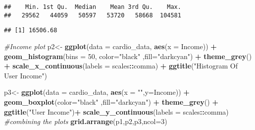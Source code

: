 \documentclass[
]{article}
\newenvironment{Shaded}{\begin{snugshade}}{\end{snugshade}}
\newcommand{\CommentTok}[1]{\textcolor[rgb]{0.56,0.35,0.01}{\textit{#1}}}
\newcommand{\DataTypeTok}[1]{\textcolor[rgb]{0.13,0.29,0.53}{#1}}
\newcommand{\DecValTok}[1]{\textcolor[rgb]{0.00,0.00,0.81}{#1}}
\newcommand{\KeywordTok}[1]{\textcolor[rgb]{0.13,0.29,0.53}{\textbf{#1}}}
\newcommand{\NormalTok}[1]{#1}
\newcommand{\OperatorTok}[1]{\textcolor[rgb]{0.81,0.36,0.00}{\textbf{#1}}}
\newcommand{\StringTok}[1]{\textcolor[rgb]{0.31,0.60,0.02}{#1}}
\begin{document}
\begin{verbatim}
##    Min. 1st Qu.  Median    Mean 3rd Qu.    Max. 
##   29562   44059   50597   53720   58668  104581
\end{verbatim}

\begin{Shaded}
\end{Shaded}

\begin{verbatim}
## [1] 16506.68
\end{verbatim}

\begin{Shaded}
\begin{Highlighting}[]
\CommentTok{#Income plot}
\NormalTok{p2<-}\StringTok{ }\KeywordTok{ggplot}\NormalTok{(}\DataTypeTok{data =}\NormalTok{ cardio_data, }\KeywordTok{aes}\NormalTok{(}\DataTypeTok{x =}\NormalTok{ Income)) }\OperatorTok{+}\StringTok{ }
\StringTok{  }\KeywordTok{geom_histogram}\NormalTok{(}\DataTypeTok{bins =} \DecValTok{50}\NormalTok{, }\DataTypeTok{color=}\StringTok{"black"}\NormalTok{ ,}\DataTypeTok{fill=}\StringTok{"darkcyan"}\NormalTok{) }\OperatorTok{+}
\StringTok{  }\KeywordTok{theme_grey}\NormalTok{() }\OperatorTok{+}\StringTok{ }\KeywordTok{scale_x_continuous}\NormalTok{(}\DataTypeTok{labels =}\NormalTok{ scales}\OperatorTok{::}\NormalTok{comma) }\OperatorTok{+}\StringTok{ }\KeywordTok{ggtitle}\NormalTok{(}\StringTok{"Histogram Of User Income"}\NormalTok{)}


\NormalTok{p3<-}\StringTok{ }\KeywordTok{ggplot}\NormalTok{(}\DataTypeTok{data =}\NormalTok{ cardio_data, }\KeywordTok{aes}\NormalTok{(}\DataTypeTok{x =} \StringTok{""}\NormalTok{,}\DataTypeTok{y=}\NormalTok{Income)) }\OperatorTok{+}\StringTok{ }
\StringTok{  }\KeywordTok{geom_boxplot}\NormalTok{(}\DataTypeTok{color=}\StringTok{"black"}\NormalTok{ ,}\DataTypeTok{fill=}\StringTok{"darkcyan"}\NormalTok{) }\OperatorTok{+}
\StringTok{  }\KeywordTok{theme_grey}\NormalTok{() }\OperatorTok{+}\StringTok{  }\KeywordTok{ggtitle}\NormalTok{(}\StringTok{"User Income"}\NormalTok{)}\OperatorTok{+}\StringTok{ }\KeywordTok{scale_y_continuous}\NormalTok{(}\DataTypeTok{labels =}\NormalTok{ scales}\OperatorTok{::}\NormalTok{comma) }
\CommentTok{#combining the plots}
\KeywordTok{grid.arrange}\NormalTok{(p1,p2,p3,}\DataTypeTok{ncol=}\DecValTok{3}\NormalTok{)}
\end{Highlighting}
\end{Shaded}
\end{document}
